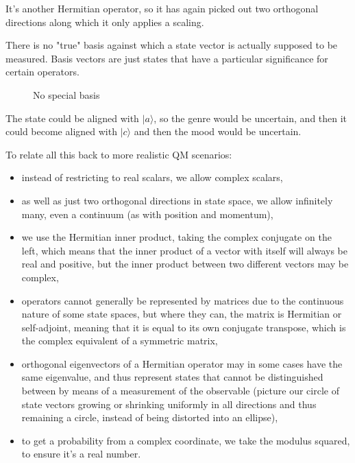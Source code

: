 It's another Hermitian operator, so it has again picked out two orthogonal directions along which it only applies a scaling.

There is no "true" basis against which a state vector is actually supposed to be measured. Basis vectors are just states that have a particular significance for certain operators.

\begin{figure}[h]
  \centering
  \centering
  \caption{No special basis} \label{fig:state-no-special-basis}
\end{figure}

The state could be aligned with $|a\rangle$, so the genre would be uncertain, and then it could become aligned with $|c\rangle$ and then the mood would be uncertain.

To relate all this back to more realistic QM scenarios:

\begin{itemize}
  \item instead of restricting to real scalars, we allow complex scalars,
  \item as well as just two orthogonal directions in state space, we allow infinitely many, even a continuum (as with position and momentum),
  \item we use the Hermitian inner product, taking the complex conjugate on the left, which means that the inner product of a vector with itself will always be real and positive, but the inner product between two different vectors may be complex,
  \item operators cannot generally be represented by matrices due to the continuous nature of some state spaces, but where they can, the matrix is Hermitian or self-adjoint, meaning that it is equal to its own conjugate transpose, which is the complex equivalent of a symmetric matrix,
  \item orthogonal eigenvectors of a Hermitian operator may in some cases have the same eigenvalue, and thus represent states that cannot be distinguished between by means of a measurement of the observable (picture our circle of state vectors growing or shrinking uniformly in all directions and thus remaining a circle, instead of being distorted into an ellipse),
  \item to get a probability from a complex coordinate, we take the modulus squared, to ensure it's a real number.
\end{itemize}

